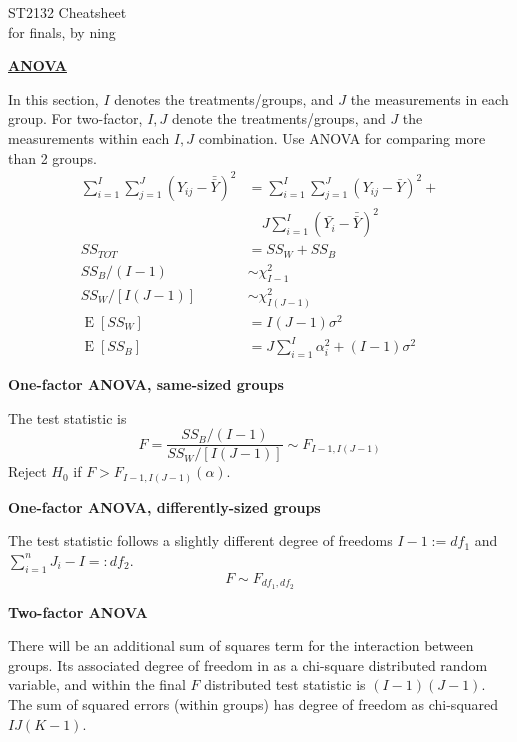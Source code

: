 \documentclass[a4paper]{article}
\newcommand{\heading}[1]{{\small\underline{\textbf{#1}}}\smallskip}
\newcommand{\subheading}[1]{{\scriptsize\textbf{#1}}}
\renewenvironment{section}[1]
  {
    \subheading{#1}

  }{
    \smallskip
  }
\newcommand{\expectation}[1]{\operatorname{E}[#1]}
\begin{document}
\scriptsize                         %
\setlength\parindent{0pt}           %
\setlength{\abovedisplayskip}{3pt}  %
\setlength{\belowdisplayskip}{3pt}  %

\begin{center}
  {\large ST2132 Cheatsheet}\\{for finals, by ning}
\end{center}

\begin{multicols*}{4}

\heading{ANOVA}

In this section, $I$ denotes the treatments/groups, and $J$ the measurements in
each group. For two-factor, $I, J$ denote the treatments/groups, and $J$ the
measurements within each $I, J$ combination. Use ANOVA for comparing more than 2
groups.
\begin{align*}
  \sum^I_{i=1}\sum^J_{j=1} (Y_{ij} - \bar{\bar{Y}})^2
    &= \sum^I_{i=1}\sum^J_{j=1} (Y_{ij} - \bar{Y})^2 + \\
    &\quad J\sum^I_{i=1} (\bar{Y_i} - \bar{\bar{Y}})^2 \\
  SS_{TOT} &= SS_W + SS_B \\
  SS_B/(I-1) &\sim \chi^2_{I-1} \\
  SS_W/[I(J-1)] &\sim \chi^2_{I(J-1)} \\
  \expectation{SS_W} &= I(J-1)\sigma^2 \\
  \expectation{SS_B} &= J\sum^I_{i=1} \alpha_i^2 + (I-1)\sigma^2
\end{align*}

\begin{section}{One-factor ANOVA, same-sized groups}
  The test statistic is
  $$F = \frac{SS_B/(I-1)}{SS_W/[I(J-1)]}
    \sim F_{I-1, I(J-1)}$$
  Reject $H_0$ if  $F > F_{I-1, I(J-1)}(\alpha)$.
\end{section}

\begin{section}{One-factor ANOVA, differently-sized groups}
  The test statistic follows a slightly different degree of freedoms $I-1 :=
  df_1$ and $\sum^n_{i=1} J_i - I =: df_2$.
  $$F \sim F_{df_1, df_2}$$
\end{section}

\begin{section}{Two-factor ANOVA}
  There will be an additional sum of squares term for the interaction between
  groups. Its associated degree of freedom in as a chi-square distributed random
  variable, and within the final $F$ distributed test statistic is $(I-1)(J-1)$.
  The sum of squared errors (within groups) has degree of freedom as chi-squared
  $IJ(K-1)$.
\end{section}


\end{multicols*}
\end{document}
